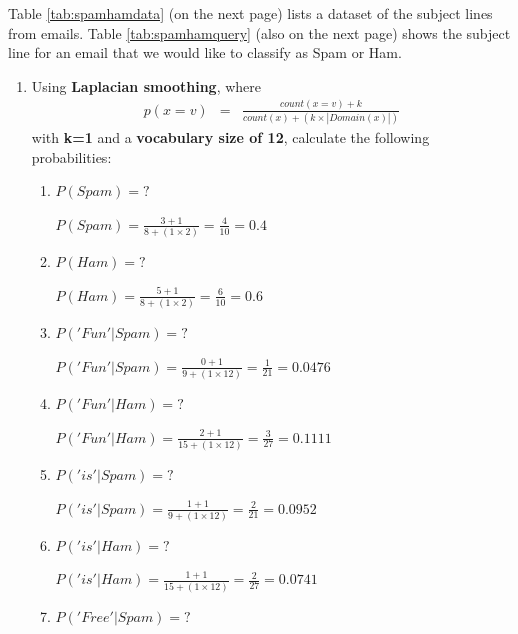 \documentclass[solution]{ditpaper}
\begin{document}
\newpage

			

	

\question Table \ref{tab:spamhamdata} (on the next page) lists a dataset of the subject lines from emails. Table \ref{tab:spamhamquery} (also on the next page) shows the subject line for an email that we would like to classify as Spam or Ham. 
	\begin{enumerate}
		\item Using \textbf{Laplacian smoothing}, where 
		\begin{eqnarray*}
		p(x=v) &=& \frac{count(x=v)+k}{count(x) +( k \times |Domain(x)|)}
		\end{eqnarray*}
		with \textbf{k=1} and a \textbf{vocabulary size of 12}, calculate the following probabilities:
			\begin{enumerate}
				\item $P(Spam)=?$
					\begin{answer}
						$P(Spam) = \frac{3+1}{8 + (1 \times 2)} = \frac{4}{10} = 0.4$
					\end{answer}
				\item $P(Ham)=?$
					\begin{answer}
						$P(Ham) = \frac{5+1}{8 + (1 \times 2)} = \frac{6}{10} = 0.6$
					\end{answer}
				\item $P('Fun'|Spam)=?$
					\begin{answer}
						$P('Fun'|Spam) = \frac{0+1}{9 + (1 \times 12)} = \frac{1}{21} = 0.0476$
					\end{answer}
				\item $P('Fun'|Ham)=?$
					\begin{answer}
						$P('Fun'|Ham) = \frac{2+1}{15 + (1 \times 12)} = \frac{3}{27} = 0.1111$
					\end{answer}
				\item $P('is'|Spam)=?$
					\begin{answer}
						$P('is'|Spam) = \frac{1+1}{9 + (1 \times 12)} = \frac{2}{21} = 0.0952$
					\end{answer}
				\item $P('is'|Ham)=?$
					\begin{answer}
						$P('is'|Ham) = \frac{1+1}{15 + (1 \times 12)} = \frac{2}{27} = 0.0741$
					\end{answer}
				\item $P('Free'|Spam)=?$

\end{enumerate}
\end{enumerate}
\end{document}
